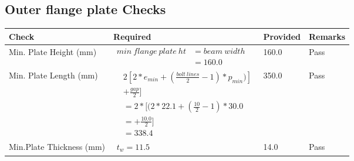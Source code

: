 \documentclass{article}%
\begin{document}
%
\newpage%
\subsection{Outer flange plate Checks}%
\label{subsec:OuterflangeplateChecks}%
\renewcommand{\arraystretch}{1.2}%
\begin{longtable}{|p{4cm}|p{6cm}|p{5.5cm}|p{1.5cm}|}%
\hline%
\rowcolor{OsdagGreen}%
Check&Required&Provided&Remarks\\%
\hline%
\endhead%
\hline%
Min. Plate Height (mm)&$\begin{aligned}min~flange~plate~ht &= beam~width\\ &=160.0\end{aligned}$&160.0&Pass\\%
\hline%
Min. Plate Length (mm)&$\begin{aligned} & 2[2*e_{min} + ({\frac{bolt~lines}{2}}-1) * p_{min})]\\ & +\frac{gap}{2}]\\ &=2*[(2*22.1 + (\frac{10}{2}-1) * 30.0\\ &= + \frac{10.0}{2}]\\ &=338.4\end{aligned}$&350.0&Pass\\%
\hline%
Min.Plate Thickness (mm)&$\begin{aligned} t_w=11.5\end{aligned}$&14.0&Pass\\%
\hline%
\end{longtable}

%
\newpage%
\end{document}
